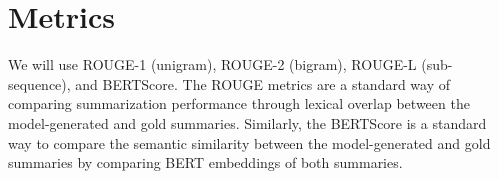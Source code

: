 \section*{Metrics}
We will use ROUGE-1 (unigram), ROUGE-2 (bigram), ROUGE-L (sub-sequence), and BERTScore. The ROUGE metrics are a standard way of comparing summarization performance through lexical overlap between the model-generated and gold summaries. Similarly, the BERTScore is a standard way to compare the semantic similarity between the model-generated and gold summaries by comparing BERT embeddings of both summaries. 

